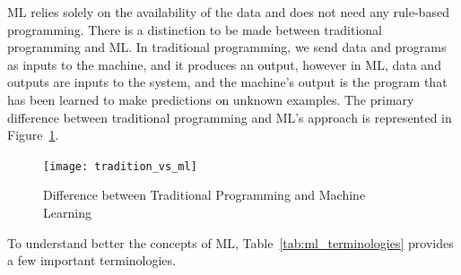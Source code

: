 \gls{ML} relies solely on the availability of the data and does not need any rule-based programming. There is a distinction to be made between traditional programming and \gls{ML}. In traditional programming, we send data and programs as inputs to the machine, and it produces an output, however in \gls{ML}, data and outputs are inputs to the system, and the machine's output is the program that has been learned to make predictions on unknown examples. The primary difference between traditional programming and \gls{ML}'s approach is represented in Figure~\ref{fig:tradition_vs_ml}.

\begin{figure}[htbp]
    \centering
    \texttt{[image: tradition\_vs\_ml]}
    \caption{Difference between Traditional Programming and Machine Learning~\cite{Kassel2017PredictingAzavea}}
    \label{fig:tradition_vs_ml}
\end{figure}

To understand better the concepts of \gls{ML}, Table~\ref{tab:ml_terminologies} provides a few important terminologies.

